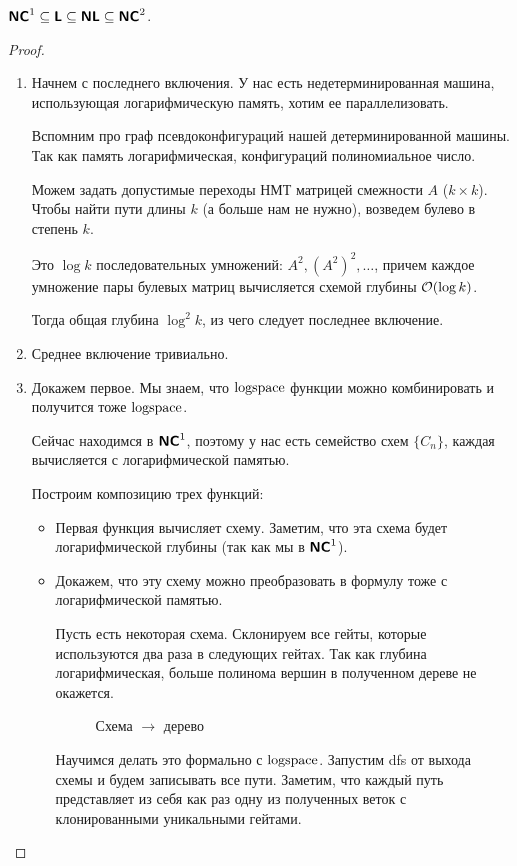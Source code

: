 \begin{thm}
	$ \textmd{\textbf{\textsf{NC}}}^{1} \subseteq \textmd{\textbf{\textsf{L}}} \subseteq \textmd{\textbf{\textsf{NL}}} \subseteq \textmd{\textbf{\textsf{NC}}}^{2}$.
\end{thm}
\begin{proof}
	\begin{enumerate}
		\item Начнем с последнего включения. У нас есть недетерминированная машина, использующая логарифмическую память, хотим ее параллелизовать.

			Вспомним про граф псевдоконфигураций нашей детерминированной машины. Так как память логарифмическая, конфигураций полиномиальное число.

			Можем задать допустимые переходы НМТ матрицей смежности $ A$ ($ k \times k$). Чтобы найти пути длины $ k$ (а больше нам не нужно), возведем булево в степень  $ k$.

			Это $ \log k$ последовательных умножений: $ A^2, (A^2)^2, \ldots  $, причем каждое умножение пары булевых матриц вычисляется схемой глубины $ \mathcal{O}(\log k)$.

			Тогда общая глубина $ \log^2 k$, из чего следует последнее включение.
		\item Среднее включение тривиально.
		\item Докажем первое.
			Мы знаем, что $ \textmd{logspace}$ функции можно комбинировать и получится тоже $ \textmd{logspace}$.

			Сейчас находимся в $ \textmd{\textbf{\textsf{NC}}}^{1}$, поэтому у нас есть семейство схем $ \{C_n\}$, каждая вычисляется с логарифмической памятью.

			Построим композицию трех функций:
			\begin{itemize}
				\item  Первая функция вычисляет схему. Заметим, что эта схема будет логарифмической глубины  (так как мы в $ \textmd{\textbf{\textsf{NC}}}^{1}$).
				\item Докажем, что эту схему  можно преобразовать в формулу тоже с логарифмической памятью.

					Пусть есть некоторая схема. Склонируем все гейты, которые используются два раза в следующих гейтах. Так как глубина логарифмическая, больше полинома вершин в полученном дереве не окажется.
					\begin{figure}[ht]
						\centering
						\caption{Схема $\to$ дерево}
						\label{fig:dag-tree}
					\end{figure}
					Научимся делать это формально с $ \textmd{logspace}$. Запустим dfs от выхода схемы и будем записывать все пути. Заметим, что каждый путь представляет из себя как раз одну из полученных веток с клонированными уникальными гейтами.


\end{itemize}
\end{enumerate}
\end{proof}
